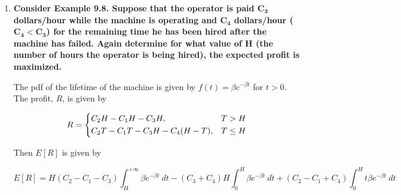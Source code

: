 \documentclass[10pt, oneside]{article}
\begin{document}
\begin{enumerate}[label=9.\arabic*]
\begin{enumerate}
	\item  \begin{tcolorbox}[
	  colback=Cerulean!5!white,
	  colframe=Cerulean!75!black]
	\textbf{Suppose that the manufacturer wants to increase his expected profit, $\bm{E[T]}$, by 50 percent. He intends to do this by increasing his profit (per gallon) on those batches of fuel meeting the specifications, $\bm{30 < X < 35}$. What must his new net profit be?}
	\end{tcolorbox}
	
	Using our answer in part (a), we determine we want $E[T] = 0.1155$. Let $y$ be the new net profit per gallon for the $30 < X < 35$ bracket:
	
	\begin{align*}
	E[T] = 0.1155 &= y [\Phi(2/3) - \Phi(-1)] + 0.05 [(\Phi(7/3) - \Phi(2/3)) + (\Phi(-1) - \Phi(-8/3))] \\
	&\quad -0.10[\Phi(-8/3) + (\Phi(67/3) - \Phi(7/3))] \\
	\implies y &= \frac{0.1155 + 0.10[\Phi(-8/3) + (\Phi(67/3) - \Phi(7/3))] - 0.05 [(\Phi(7/3) - \Phi(2/3)) + (\Phi(-1) - \Phi(-8/3))]}{\Phi(2/3) - \Phi(-1)} \\
	&\approx \boxed{\$ 0.16 \text{ per gallon}}
	\end{align*}
	\end{enumerate}

\item  \begin{tcolorbox}[
  colback=Cerulean!5!white,
  colframe=Cerulean!75!black]
\textbf{Consider Example 9.8. Suppose that the operator is paid $\bm{C_3}$ dollars/hour while the machine is operating and $\bm{C_4}$ dollars/hour ($\bm{C_4 < C_3}$) for the remaining time he has been hired after the machine has failed. Again determine for what value of $\bm{H}$ (the number of hours the operator is being hired), the expected profit is maximized.}
\end{tcolorbox}

The pdf of the lifetime of the machine is given by $f(t) = \beta e^{-\beta t}$ for $t > 0$. The profit, $R$, is given by

\[
R = \begin{dcases}
C_2 H - C_1 H - C_3 H, & T > H \\
C_2 T - C_1 T - C_3 H - C_4 (H - T), & T \leq H
\end{dcases}
\]

Then $E[R]$ is given by

\[ E[R] = H(C_2 - C_1 - C_3) \int^{+\infty}_H \beta e^{-\beta t} \ dt - (C_3 + C_4) H \int^H_0 \beta e^{-\beta t} \ dt + (C_2 - C_1 + C_4) \int^H_0 t \beta e^{-\beta t} \ dt \]


\end{enumerate}
\end{document}
